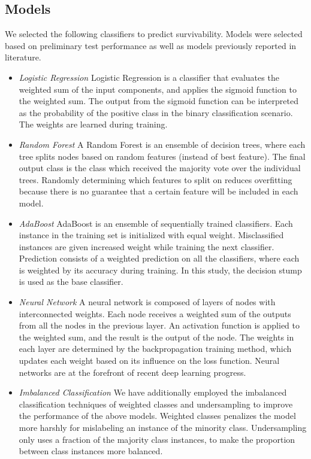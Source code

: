 \documentclass[review]{elsarticle}
\begin{document}
\subsection*{Models}
We selected the following classifiers to predict survivability. Models were selected based on preliminary test performance as well as models previously reported in literature.
\begin{itemize}
	\item \textit{Logistic Regression} Logistic Regression is a classifier that evaluates the weighted sum of the input components, and applies the sigmoid function to the weighted sum. The output from the sigmoid function can be interpreted as the probability of the positive class in the binary classification scenario. The weights are learned during training.
	\item \textit{Random Forest} A Random Forest is an ensemble of decision trees, where each tree splits nodes based on random features (instead of best feature)\cite{breiman2001random}. The final output class is the class which received the majority vote over the individual trees. Randomly determining which features to split on reduces overfitting because there is no guarantee that a certain feature will be included in each model. 
	\item \textit{AdaBoost} AdaBoost\cite{freund1999short} is an ensemble of sequentially trained classifiers. Each instance in the training set is initialized with equal weight. Misclassified instances are given increased weight while training the next classifier. Prediction consists of a weighted prediction on all the classifiers, where each is weighted by its accuracy during training. In this study, the decision stump is used as the base classifier.
	\item \textit {Neural Network} A neural network is composed of layers of nodes with interconnected weights. Each node receives a weighted sum of the outputs from all the nodes in the previous layer. An activation function is applied to the weighted sum, and the result is the output of the node. The weights in each layer are determined by the backpropagation training method, which updates each weight based on its influence on the loss function. Neural networks are at the forefront of recent deep learning progress\cite{lecun2015deep}.
	\item \textit {Imbalanced Classification} We have additionally employed the imbalanced classification techniques of weighted classes and undersampling to improve the performance of the above models. Weighted classes penalizes the model more harshly for mislabeling an instance of the minority class. Undersampling only uses a fraction of the majority class instances, to make the proportion between class instances more balanced\cite{he2008learning}.
	
	
\end{itemize}
\end{document}
